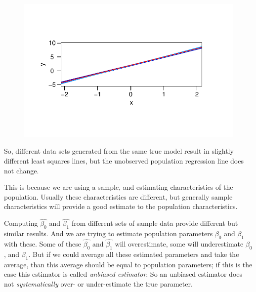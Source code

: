 \documentclass[
  letterpaper,
  DIV=11,
  numbers=noendperiod]{scrreprt}
\newenvironment{Shaded}{\begin{snugshade}}{\end{snugshade}}
\newcommand{\AttributeTok}[1]{\textcolor[rgb]{0.65,0.35,0.00}{#1}}
\newcommand{\DecValTok}[1]{\textcolor[rgb]{0.47,0.16,0.63}{#1}}
\newcommand{\FunctionTok}[1]{\textcolor[rgb]{0.02,0.16,0.49}{#1}}
\newcommand{\NormalTok}[1]{\textcolor[rgb]{0.33,0.33,0.33}{#1}}
\newcommand{\SpecialCharTok}[1]{\textcolor[rgb]{0.00,0.46,0.62}{#1}}
\newcommand{\StringTok}[1]{\textcolor[rgb]{0.00,0.50,0.00}{#1}}
\begin{document}
\begin{Shaded}
\end{Shaded}

\begin{figure}[H]

{\centering \includegraphics{Chapter3_files/figure-pdf/unnamed-chunk-19-1.pdf}

}

\end{figure}

So, different data sets generated from the same true model result in
slightly different least squares lines, but the unobserved population
regression line does not change.

This is because we are using a sample, and estimating characteristics of
the population. Usually these characteristics are different, but
generally sample characteristics will provide a good estimate to the
population characteristics.

Computing \(\hat{\beta_0}\) and \(\hat{\beta_1}\) from different sets of
sample data provide different but similar results. And we are trying to
estimate population parameters \(\beta_0\) and \(\beta_1\) with these.
Some of these \(\hat{\beta_0}\) and \(\hat{\beta_1}\) will overestimate,
some will underestimate \(\beta_0\), and \(\beta_1\). But if we could
average all these estimated parameters and take the average, than this
average should be equal to population parameters; if this is the case
this estimator is called \emph{unbiased estimator}. So an unbiased
estimator does not \emph{systematically} over- or under-estimate the
true parameter.
\end{document}
